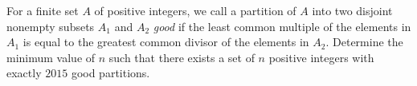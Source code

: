 For a finite set $A$ of positive integers, we call a partition of $A$ into two disjoint nonempty subsets $A_1$ and $A_2$ \emph{good} if the least common multiple of the elements in $A_1$ is equal to the greatest common divisor of the elements in $A_2$. Determine the minimum value of $n$ such that there exists a set of $n$ positive integers with exactly $2015$ good partitions.
